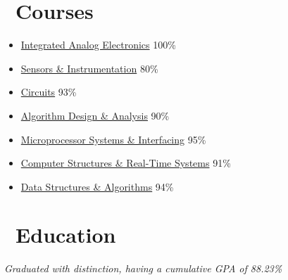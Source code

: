 \documentclass{resume}
\begin{document}

\section{\faBook\ Courses}

\begin{itemize}
  \item \href{http://www.ucalendar.uwaterloo.ca/1617/COURSE/course-ECE.html#ECE444}{Integrated Analog Electronics} \hfill 100\%
  \item \href{http://www.ucalendar.uwaterloo.ca/1516/COURSE/course-MTE.html#MTE220}{Sensors \& Instrumentation} \hfill 80\%
  \item \href{http://www.ucalendar.uwaterloo.ca/1516/COURSE/course-MTE.html#MTE120}{Circuits} \hfill 93\%
\end{itemize}

\begin{itemize}
  \item \href{http://www.ucalendar.uwaterloo.ca/1617/COURSE/course-ECE.html#ECE406}{Algorithm Design \& Analysis} \hfill 90\%
  \item \href{http://www.ucalendar.uwaterloo.ca/1516/COURSE/course-MTE.html#MTE341}{Microprocessor Systems \& Interfacing} \hfill 95\%
  \item \href{http://www.ucalendar.uwaterloo.ca/1516/COURSE/course-MTE.html#MTE241}{Computer Structures \& Real-Time Systems} \hfill 91\%
  \item \href{http://www.ucalendar.uwaterloo.ca/1516/COURSE/course-MTE.html#MTE262}{Data Structures \& Algorithms} \hfill 94\%
\end{itemize}



\section{\faGraduationCap\ Education}
\textit{Graduated with distinction, having a cumulative GPA of 88.23\%}

\end{document}
